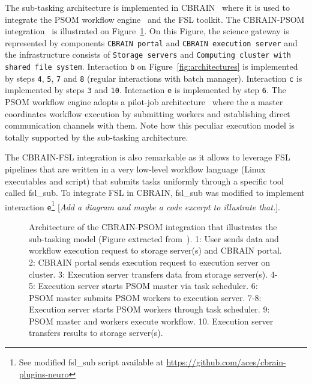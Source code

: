 \documentclass[preprint,3p,twocolumn]{elsarticle}
\newcommand{\todo}[1]{\color{blue}\xspace[\emph{#1}]\xspace\color{black}}
\begin{document}
The sub-tasking architecture is implemented in CBRAIN~\cite{SHER-14}
where it is used to integrate the PSOM workflow
engine~\cite{bellec2012pipeline} and the FSL toolkit. The CBRAIN-PSOM
integration~\cite{GLAT-16} is illustrated on
Figure~\ref{fig:cbrain-psom-architecture}. On this Figure, the science
gateway is represented by components \texttt{CBRAIN portal} and
\texttt{CBRAIN execution server} and the infrastructure consists of
\texttt{Storage servers} and \texttt{Computing cluster with shared
  file system}. Interaction \texttt{b} on
Figure~\ref{fig:architectures} is implemented by steps \texttt{4},
\texttt{5}, \texttt{7} and \texttt{8} (regular interactions with batch
manager). Interaction \texttt{c} is implemented by steps \texttt{3}
and \texttt{10}. Interaction \texttt{e} is implemented by step
\texttt{6}. The PSOM workflow engine adopts a pilot-job
architecture~\cite{turilli2015comprehensive} where the a master
coordinates workflow execution by submitting workers and establishing
direct communication channels with them. Note how this peculiar
execution model is totally supported by the sub-tasking architecture.

The CBRAIN-FSL integration is also remarkable as it allows to leverage
FSL pipelines that are written in a very low-level workflow language
(Linux executables and script) that submits tasks uniformly through a
specific tool called fsl\_sub. To integrate FSL in CBRAIN,
fsl\_sub was modified to implement interaction
\texttt{e}\footnote{See modified fsl\_sub script available at
  \url{https://github.com/aces/cbrain-plugins-neuro}} \todo{Add a
  diagram and maybe a code excerpt to illustrate that.}.

\begin{figure}
\def\svgwidth{\columnwidth}

\caption{Architecture of the CBRAIN-PSOM integration that illustrates
  the sub-tasking model (Figure extracted from~\cite{GLAT-16}). 1:
  User sends data and workflow execution request to storage server(s)
  and CBRAIN portal. 2: CBRAIN portal sends execution request to
  execution server on cluster. 3: Execution server transfers data from
  storage server(s). 4-5: Execution server starts PSOM master via task
  scheduler. 6: PSOM master submits PSOM workers to execution
  server. 7-8: Execution server starts PSOM workers through task
  scheduler. 9: PSOM master and workers execute workflow. 10.
  Execution server transfers results to storage server(s).}
\label{fig:cbrain-psom-architecture}
\end{figure}
\end{document}
